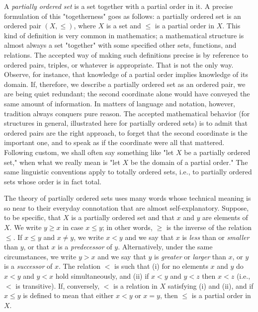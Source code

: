 A \textit{partially ordered set} is a set together with a partial order in it. A precise formulation of this "togetherness" goes as follows: a partially ordered set is an ordered pair $(X, \le)$, where $X$ is a set and $\le$ is a partial order in $X$. This kind of definition is very common in mathematics; a mathematical structure is almost always a set "together" with some specified other sets, functions, and relations. The accepted way of making such definitions precise is by reference to ordered pairs, triples, or whatever is appropriate. That is not the only way. Observe, for instance, that knowledge of a partial order implies knowledge of its domain. If, therefore, we describe a partially ordered set as an ordered pair, we are being quiet redundant; the second  coordinate alone would have conveyed the same amount of information. In matters of language and notation, however, tradition always conquers pure reason. The accepted mathematical behavior (for structures in general, illustrated here for partially ordered sets) is to admit that ordered pairs are the right approach, to forget that the second coordinate is the important one, and to speak as if the coordinate were all that mattered. Following custom, we shall often say something like "let $X$ be a partially ordered set," when what we really mean is "let $X$ be the domain of a partial order." The same linguistic conventions apply to totally ordered sets, i.e., to partially ordered sets whose order is in fact total. 

The theory of partially ordered sets uses many words whose technical meaning is so near to their everyday connotation that are almost self-explanatory. Suppose, to be specific, that $X$ is a partially ordered set and that $x$ and $y$ are elements of $X$. We write $y \ge x$ in case $x \le y$; in other words, $\ge$ is the inverse of the relation $\le$. If $x \le y$ and $x \neq y$, we write $x < y$ and we say that $x$ is \textit{less} than or \textit{smaller} than $y$, or that $x$ is a \textit{predecessor} of $y$. Alternatively, under the same circumstances, we write $y > x$ and we say that $y$ is \textit{greater} or \textit{larger} than $x$, or $y$ is a \textit{successor} of $x$. The relation $<$ is such that (i) for no elements $x$ and $y$ do $x < y$ and $y < x$ hold simultaneously, and (ii) if $x < y$ and $y < z$ then $x < z$ (i.e., $<$ is transitive). If, conversely, $<$ is a relation in $X$ satisfying (i) and (ii), and if $x \le y$ is defined to mean that either $x < y$ or $x = y$, then $\le$ is a partial order in $X$. 

